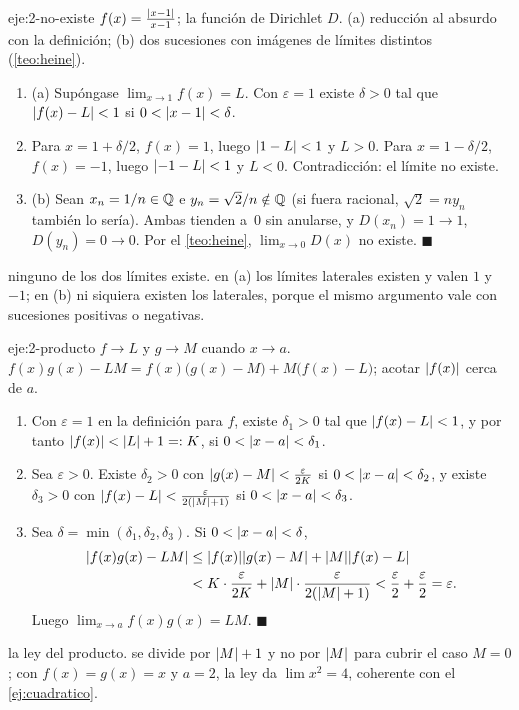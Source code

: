 \begin{solucion}{eje:2-no-existe}
\datos $f(x)=\frac{\lvert x-1\rvert}{x-1}$; la función de Dirichlet $D$.
\planteamiento (a) reducción al absurdo con la definición; (b) dos sucesiones con imágenes de límites distintos (\cref{teo:heine}).
\pasos
\begin{enumerate}[label=\arabic*.]
  \item (a) Supóngase $\lim_{x\to1}f(x)=L$. Con $\varepsilon=1$ existe $\delta>0$ tal que $\lvert f(x)-L\rvert<1$ si $0<\lvert x-1\rvert<\delta$.
  \item Para $x=1+\delta/2$, $f(x)=1$, luego $\lvert1-L\rvert<1$ y $L>0$. Para $x=1-\delta/2$, $f(x)=-1$, luego $\lvert-1-L\rvert<1$ y $L<0$. Contradicción: el límite no existe.
  \item (b) Sean $x_n=1/n\in\mathbb{Q}$ e $y_n=\sqrt2/n\notin\mathbb{Q}$ (si fuera racional, $\sqrt2=ny_n$ también lo sería). Ambas tienden a~0 sin anularse, y $D(x_n)=1\to1$, $D(y_n)=0\to0$. Por el \cref{teo:heine}, $\lim_{x\to0}D(x)$ no existe. \hfill$\blacksquare$
\end{enumerate}
\resultado ninguno de los dos límites existe.
\comprobacion en (a) los límites laterales existen y valen $1$ y $-1$; en (b) ni siquiera existen los laterales, porque el mismo argumento vale con sucesiones positivas o negativas.
\end{solucion}

\begin{solucion}{eje:2-producto}
\datos $f\to L$ y $g\to M$ cuando $x\to a$.
\planteamiento $f(x)g(x)-LM=f(x)\bigl(g(x)-M\bigr)+M\bigl(f(x)-L\bigr)$; acotar $\lvert f(x)\rvert$ cerca de $a$.
\pasos
\begin{enumerate}[label=\arabic*.]
  \item Con $\varepsilon=1$ en la definición para $f$, existe $\delta_1>0$ tal que $\lvert f(x)-L\rvert<1$, y por tanto $\lvert f(x)\rvert<\lvert L\rvert+1=:K$, si $0<\lvert x-a\rvert<\delta_1$.
  \item Sea $\varepsilon>0$. Existe $\delta_2>0$ con $\lvert g(x)-M\rvert<\frac{\varepsilon}{2K}$ si $0<\lvert x-a\rvert<\delta_2$, y existe $\delta_3>0$ con $\lvert f(x)-L\rvert<\frac{\varepsilon}{2(\lvert M\rvert+1)}$ si $0<\lvert x-a\rvert<\delta_3$.
  \item Sea $\delta=\min(\delta_1,\delta_2,\delta_3)$. Si $0<\lvert x-a\rvert<\delta$,
  \begin{align*}
  \lvert f(x)g(x)-LM\rvert&\le\lvert f(x)\rvert\lvert g(x)-M\rvert+\lvert M\rvert\lvert f(x)-L\rvert\\
  &<K\cdot\frac{\varepsilon}{2K}+\lvert M\rvert\cdot\frac{\varepsilon}{2(\lvert M\rvert+1)}<\frac\varepsilon2+\frac\varepsilon2=\varepsilon.
  \end{align*}
  Luego $\lim_{x\to a}f(x)g(x)=LM$. \hfill$\blacksquare$
\end{enumerate}
\resultado la ley del producto.
\comprobacion se divide por $\lvert M\rvert+1$ y no por $\lvert M\rvert$ para cubrir el caso $M=0$; con $f(x)=g(x)=x$ y $a=2$, la ley da $\lim x^{2}=4$, coherente con el \cref{ej:cuadratico}.
\end{solucion}

